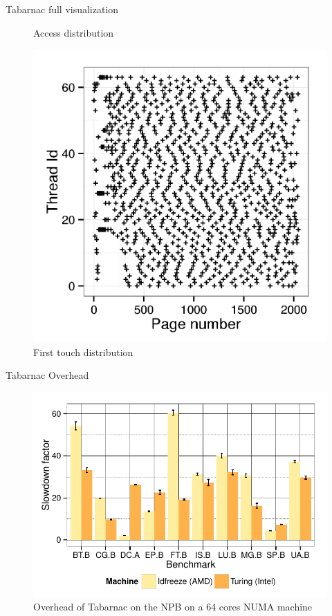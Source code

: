 \documentclass[xcolor={usenames,dvipsnames}]{beamer}
\begin{document}
\begin{frame}{Tabarnac full visualization}
\begin{figure}
{{{                    \caption{Access distribution}
                }{
                    \includegraphics[width=.6\linewidth]{tabarnac_ft.png}
                    \caption{First touch distribution}
                }
            }
        }
    \end{figure}
    \pause
    \pause
    \pause
\end{frame}



\setcounter{framenumber}{\value{finalframe}}
\begin{frame}{Tabarnac Overhead}
    \begin{figure}
        \centering
        \includegraphics[width=.8\linewidth]{tabarnac_ovh.pdf}
        \caption{Overhead of Tabarnac on the NPB on a 64 cores NUMA machine}
    \end{figure}
\end{frame}
\end{document}
